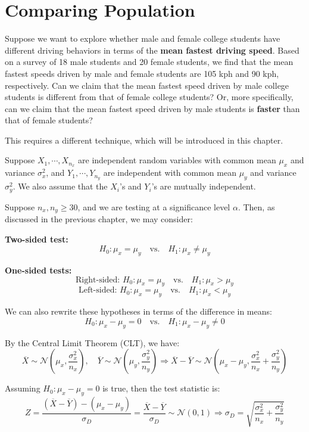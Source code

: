 \chapter{Comparing Population}

Suppose we want to explore whether male and female college students have different driving behaviors in terms of the \textbf{mean fastest driving speed}. Based on a survey of 18 male students and 20 female students, we find that the mean fastest speeds driven by male and female students are 105 kph and 90 kph, respectively. Can we claim that the mean fastest speed driven by male college students is different from that of female college students? Or, more specifically, can we claim that the mean fastest speed driven by male students is \textbf{faster} than that of female students?

This requires a different technique, which will be introduced in this chapter.

Suppose \(X_1, \cdots, X_{n_x}\) are independent random variables with common mean \(\mu_x\) and variance \(\sigma_x^2\), and \(Y_1, \cdots, Y_{n_y}\) are independent with common mean \(\mu_y\) and variance \(\sigma_y^2\). We also assume that the \(X_i\)'s and \(Y_i\)'s are mutually independent.

Suppose \(n_x, n_y \geq 30\), and we are testing at a significance level \(\alpha\). Then, as discussed in the previous chapter, we may consider:

\textbf{Two-sided test:}
\[
  H_0: \mu_x = \mu_y \quad \text{vs.} \quad H_1: \mu_x \neq \mu_y
\]

\textbf{One-sided tests:}
\[
  \text{Right-sided: } H_0: \mu_x = \mu_y \quad \text{vs.} \quad H_1: \mu_x > \mu_y
\]
\[
  \text{Left-sided: } H_0: \mu_x = \mu_y \quad \text{vs.} \quad H_1: \mu_x < \mu_y
\]

We can also rewrite these hypotheses in terms of the difference in means:
\[
  H_0: \mu_x - \mu_y = 0 \quad \text{vs.} \quad H_1: \mu_x - \mu_y \neq 0
\]

By the Central Limit Theorem (CLT), we have:
\[
  \overline{X} \sim \mathcal{N} \left( \mu_x, \frac{\sigma_x^2}{n_x} \right), \quad \overline{Y} \sim \mathcal{N} \left( \mu_y, \frac{\sigma_y^2}{n_y} \right) \Longrightarrow \overline{X} - \overline{Y} \sim \mathcal{N} \left( \mu_x - \mu_y, \frac{\sigma_x^2}{n_x} + \frac{\sigma_y^2}{n_y} \right)
\]

Assuming \(H_0: \mu_x - \mu_y = 0\) is true, then the test statistic is:
\[
  Z = \frac{(\overline{X} - \overline{Y}) - (\mu_x - \mu_y)}{\sigma_D} = \frac{\overline{X} - \overline{Y}}{\sigma_D} \sim \mathcal{N}(0, 1) \Longrightarrow \sigma_D = \sqrt{\frac{\sigma_x^2}{n_x} + \frac{\sigma_y^2}{n_y}}
\]

